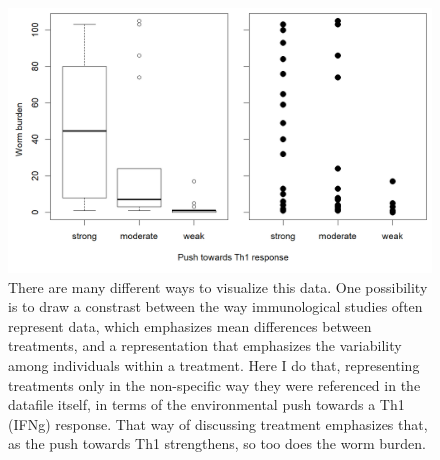 \documentclass[12pt,reqno,final,pdftex]{amsart}\usepackage[]{graphicx}\usepackage[]{color}
\newenvironment{knitrout}{}{} %
\theoremstyle{plain}
\numberwithin{equation}{part}
\begin{document}
\begin{knitrout}\scriptsize
{}\color{fgcolor}\begin{figure}

\includegraphics[width=\linewidth]{figure/unnamed-chunk-2-1} \hfill{}

\caption[There are many different ways to visualize this data]{There are many different ways to visualize this data. One possibility is to draw a constrast between the way immunological studies often represent data, which emphasizes mean differences between treatments, and a representation that emphasizes the variability among individuals within a treatment. Here I do that, representing treatments only in the non-specific way they were referenced in the datafile itself, in terms of the environmental push towards a Th1 (IFNg) response. That way of discussing treatment emphasizes that, as the push towards Th1 strengthens, so too does the worm burden.}\label{fig:unnamed-chunk-2}
\end{figure}


\end{knitrout}

\newpage
\end{document}
